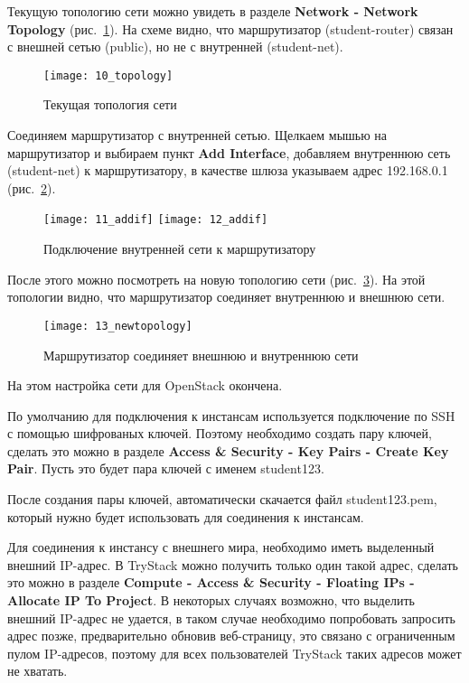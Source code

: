 Текущую топологию сети можно увидеть в разделе \textbf{Network - Network Topology} (рис.~\ref{pic:topology}).
На схеме видно, что маршрутизатор (student-router) связан с внешней сетью (public), но не с внутренней (student-net).
\begin{figure}[ht]
    \centering
    \texttt{[image: 10\_topology]}
    \caption{Текущая топология сети}\label{pic:topology}
\end{figure}

Соединяем маршрутизатор с внутренней сетью.
Щелкаем мышью на маршрутизатор и выбираем пункт \textbf{Add Interface}, добавляем внутреннюю сеть (student-net) к маршрутизатору, в качестве шлюза указываем адрес 192.168.0.1 (рис.~\ref{pic:addif}).
\begin{figure}[ht]
    \centering
    \texttt{[image: 11\_addif]}
    \texttt{[image: 12\_addif]}
    \caption{Подключение внутренней сети к маршрутизатору}\label{pic:addif}
\end{figure}

После этого можно посмотреть на новую топологию сети (рис.~\ref{pic:new_topology}).
На этой топологии видно, что маршрутизатор соединяет внутреннюю и внешнюю сети.
\begin{figure}[ht]
    \centering
    \texttt{[image: 13\_newtopology]}
    \caption{Маршрутизатор соединяет внешнюю и внутреннюю сети}\label{pic:new_topology}
\end{figure}

На этом настройка сети для OpenStack окончена.

\clearpage

По умолчанию для подключения к инстансам используется подключение по SSH с помощью шифрованых ключей.
Поэтому необходимо создать пару ключей, сделать это можно в разделе \textbf{Access \& Security - Key Pairs - Create Key Pair}.
Пусть это будет пара ключей с именем student123.

После создания пары ключей, автоматически скачается файл student123.pem, который нужно будет использовать для соединения к инстансам.

Для соединения к инстансу с внешнего мира, необходимо иметь выделенный внешний IP-адрес.
В TryStack можно получить только один такой адрес, сделать это можно в разделе \textbf{Compute - Access \& Security - Floating IPs - Allocate IP To Project}.
В некоторых случаях возможно, что выделить внешний IP-адрес не удается, в таком случае необходимо попробовать запросить адрес позже, предварительно обновив веб-страницу, это связано с ограниченным пулом IP-адресов, поэтому для всех пользователей TryStack таких адресов может не хватать.

